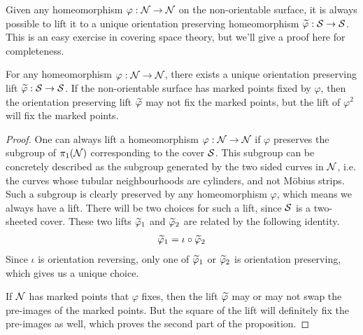 Given any homeomorphism $\varphi: \mathcal{N} \to \mathcal{N}$ on the non-orientable surface, it is always possible to lift it
to a unique orientation preserving homeomorphism $\widetilde{\varphi}: \mathcal{S} \to \mathcal{S}$. This is an easy exercise in covering
space theory, but we'll give a proof here for completeness.
\begin{prop}
  For any homeomorphism $\varphi: \mathcal{N} \to \mathcal{N}$, there exists a unique orientation preserving lift
  $\widetilde{\varphi}: \mathcal{S} \to \mathcal{S}$. If the non-orientable surface has marked points fixed by $\varphi$, then
  the orientation preserving lift $\widetilde{\varphi}$ may not fix the marked points, but the lift of $\varphi^2$ will
  fix the marked points.
\end{prop}
\begin{proof}
  One can always lift a homeomorphism $\varphi: \mathcal{N} \to \mathcal{N}$ if $\varphi$ preserves the subgroup of $\pi_1(\mathcal{N})$ corresponding
  to the cover $\mathcal{S}$. This subgroup can be concretely described as the subgroup generated by the two sided curves
  in $\mathcal{N}$, i.e. the curves whose tubular neighbourhoods are cylinders, and not M\"obius strips. Such a subgroup
  is clearly preserved by any homeomorphism $\varphi$, which means we always have a lift. There will be two choices
  for such a lift, since $\mathcal{S}$ is a two-sheeted cover. These two lifts $\widetilde{\varphi}_1$ and $\widetilde{\varphi}_2$ are related
  by the following identity.
  \begin{align*}
    \widetilde{\varphi}_1 = \iota \circ \widetilde{\varphi}_2
  \end{align*}
  Since $\iota$ is orientation reversing, only one of $\widetilde{\varphi}_1$ or $\widetilde{\varphi}_2$ is orientation preserving, which
  gives us a unique choice.

  If $\mathcal{N}$ has marked points that $\varphi$ fixes, then the lift $\widetilde{\varphi}$ may or may not swap the pre-images of the
  marked points. But the square of the lift will definitely fix the pre-images as well, which proves the second
  part of the proposition.
\end{proof}

